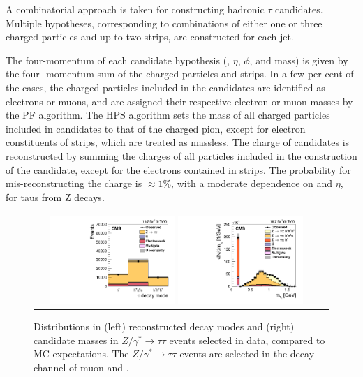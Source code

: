 A combinatorial approach is taken for constructing hadronic \ensuremath{\tau} candidates. Multiple \hadtau hypotheses, corresponding to combinations of either one or three charged particles and up to two strips, are constructed for each jet.

The four-momentum of each \hadtau candidate hypothesis (\pt, \ensuremath{\eta}, \ensuremath{\phi}, and mass) is given by the four- momentum sum of the charged particles and strips. In a few per cent of the cases, the charged particles included in the \hadtau candidates are identified as electrons or muons, and are assigned their respective electron or muon masses by the PF algorithm. The HPS algorithm sets the mass of all charged particles included in \hadtau candidates to that of the charged pion, except for electron constituents of strips, which are treated as massless. The charge of \hadtau candidates is reconstructed by summing the charges of all particles included in the construction of the \hadtau candidate, except for the electrons contained in strips. The probability for mis-reconstructing the \hadtau charge is \ensuremath{\approx 1 \%}, with a moderate dependence on \pt and \ensuremath{\eta}, for taus from Z decays.

\begin{figure}[tbh!]
	\centering
	\begin{tabular}{cc}
		\includegraphics[width=0.45\textwidth]{objreconstruction/pics/scalefactors050314.png}
		\includegraphics[width=0.45\textwidth]{objreconstruction/pics/plots_paper_tauIdAlgorithm_ZTT_mTau_ZTT_linear.png} 		
	\end{tabular}
	\caption{Distributions in (left) reconstructed \hadtau decay modes and (right) \hadtau candidate masses in \ensuremath{Z/\gamma^{*} \longrightarrow \tau\tau}  events selected in data, compared to MC expectations. The \ensuremath{Z/\gamma^{*} \longrightarrow \tau\tau}  events are selected in the decay channel of muon and \hadtau \cite{Khachatryan:2015dfa}.}
	\label{fig:Ztautau_decaymodes}
\end{figure}

